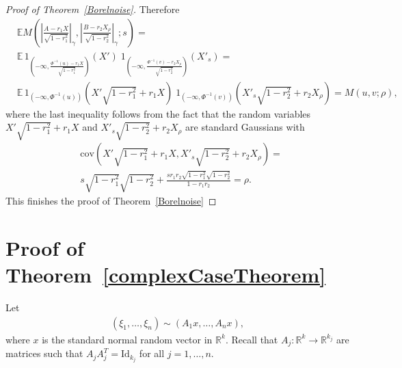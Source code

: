 \documentclass[9pt, a4paper]{amsart}
\newcommand{\R}{\mathbb{R}}
\newcommand{\1}{{\chi_{}}}%
\numberwithin{equation}{section}
\begin{document}
\begin{proof}[Proof of Theorem~\ref{Borelnoise}]
 Therefore 
 \begin{align*}
     &\mathbb{E} M\left(\left|\frac{A-r_{1}X}{\sqrt{1-r_{1}^{2}}}\right|_{\gamma}, \left|\frac{B-r_{2}X_{\rho}}{\sqrt{1-r_{2}^{2}}}\right|_{\gamma}; s\right) = \\
     &\mathbb{E} \, 1_{\left(-\infty, \frac{\Phi^{-1}(u)-r_{1}X}{\sqrt{1-r_{1}^{2}}}\right)}(X') \; 1_{\left(-\infty, \frac{\Phi^{-1}(v)-r_{2}X_{\rho}}{\sqrt{1-r_{2}^{2}}} \right)} (X'_{s}) =\\
     &\mathbb{E} \, 1_{\left(-\infty, \Phi^{-1}(u)\right)}(X'\sqrt{1-r_{1}^{2}}+r_{1}X) \; 1_{\left(-\infty, \Phi^{-1}(v) \right)} (X'_{s}\sqrt{1-r_{2}^{2}}+r_{2}X_{\rho}) = M(u,v; \rho),
 \end{align*}
 where the last inequality follows from the fact that the random variables $X'\sqrt{1-r_{1}^{2}}+r_{1}X$ and $X'_{s}\sqrt{1-r_{2}^{2}}+r_{2}X_{\rho}$ are standard Gaussians with 
 \begin{align*}
     &\mathrm{cov}(X'\sqrt{1-r_{1}^{2}}+r_{1}X, X'_{s}\sqrt{1-r_{2}^{2}}+r_{2}X_{\rho})= \\
     &s \sqrt{1-r_{1}^{2}}\sqrt{1-r_{2}^{2}} + \frac{sr_{1}r_{2}\sqrt{1-r_{1}^{2}}\sqrt{1-r_{2}^{2}}}{1-r_{1}r_{2}} = \rho. 
 \end{align*}
 This finishes the proof of Theorem~\ref{Borelnoise}
\end{proof}



	
\section{\textbf{Proof of Theorem~\ref{complexCaseTheorem}}}\label{ComplexProof}
Let 
\begin{align*}
(\xi_1,\ldots,\xi_n)\sim (A_1x,\ldots,A_nx),
\end{align*}
where $x$ is the standard normal random vector in $\R^k$. Recall that $A_{j} : \mathbb{R}^{k}\to \mathbb{R}^{k_{j}}$ are matrices such that $A_{j}A^{T}_{j}=\mathrm{Id}_{k_{j}}$ for all $j=1, \ldots, n$. 
\end{document}
